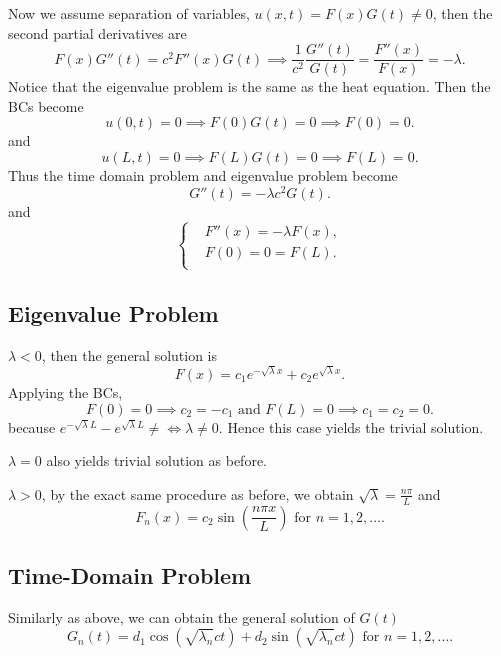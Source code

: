\documentclass[class=article,crop=false]{standalone}
\begin{document}
Now we assume separation of variables, $ u(x,t) = F(x)G(t) \neq 0$, then the second partial derivatives are 
 \[
	 F(x)G''(t)= c^2F''(x)G(t) \implies \frac{1}{c^2} \frac{G''(t)}{G(t) }= \frac{F''(x)}{F(x) } = -\lambda
.\] 
Notice that the eigenvalue problem is the same as the heat equation. Then the BCs become
\[
	u(0,t)=0 \implies F(0)G(t)=0 \implies F(0)=0
.\] 
and
\[
	u(L,t) = 0 \implies F(L)G(t) = 0 \implies F(L) = 0
.\]
Thus the time domain problem and eigenvalue problem become
\[
	G''(t)=-\lambda c^2 G(t)
.\] 
and
\begin{equation*}
\begin{cases}
	&F''(x) = -\lambda F(x),	\\
	& F(0)=0=F(L).\\
\end{cases}
\end{equation*}

\subsection{Eigenvalue Problem}

\begin{case}[]
$ \lambda < 0$, then the general solution is
\[
	F(x) = c_1 e^{-\sqrt{\lambda}x } + c_2 e^{\sqrt{\lambda}x }
.\] 
Applying the BCs,
\[
	F(0) = 0 \implies c_2= -c_1 \text{ and } F(L) = 0 \implies c_1 = c_2 =0 
.\]
because $ e^{-\sqrt{\lambda} L } - e^{\sqrt{\lambda} L} \neq \iff \lambda \neq 0$. Hence this case yields the trivial solution. 
\end{case}
\begin{case}[]
$ \lambda = 0$ also yields trivial solution as before.
\end{case}
\begin{case}[]
$ \lambda >0$, by the exact same procedure as before, we obtain $ \sqrt{\lambda}  =\frac{n \pi }{L } $ and 
\[
	F_n(x) = c_2 \sin \left( \frac{ n\pi x}{ L} \right) \text{ for } n =1,2,\ldots 
.\] 
\end{case}
\subsection{Time-Domain Problem}
Similarly as above, we can obtain the general solution of $ G(t)$
\[
	G_n(t) = d_1 \cos(\sqrt{\lambda_n}ct  )+ d_2 \sin(\sqrt{\lambda_n}ct  ) \text{ for }n=1,2,\ldots 
.\] 
\end{document}
